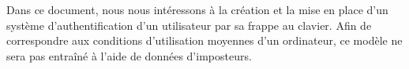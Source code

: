 Dans ce document, nous nous intéressons à la création et la mise en place d'un système d'authentification d'un utilisateur par sa frappe au clavier. Afin de correspondre aux conditions d'utilisation moyennes d'un ordinateur, ce modèle ne sera pas entraîné à l'aide de données d'imposteurs.